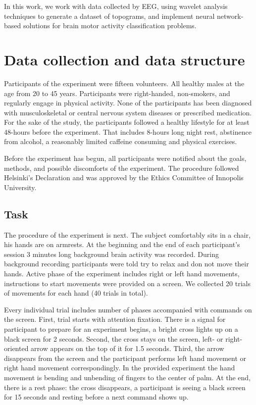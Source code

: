 \documentclass[conference]{IEEEtran}
\begin{document}
In this work, we work with data collected by EEG, using wavelet analysis techniques to generate a dataset of topograms, and implement neural network-based solutions for brain motor activity classification problems.

\section{Data collection and data structure}

Participants of the experiment were fifteen volunteers. All healthy males at the age from 20 to 45 years. Participants were right-handed, non-smokers, and regularly engage in physical activity. None of the participants has been diagnosed with musculoskeletal or central nervous system diseases or prescribed medication. For the sake of the study, the participants followed a healthy lifestyle for at least 48-hours before the experiment. That includes 8-hours long night rest, abstinence from alcohol, a reasonably limited caffeine consuming and physical exercises. 

Before the experiment has begun, all participants were notified about the goals, methods, and possible discomforts of the experiment. The procedure followed Helsinki's Declaration and was approved by the Ethics Committee of Innopolis University.

\subsection{Task}

The procedure of the experiment is next. The subject comfortably sits in a chair, his hands are on armrests. At the beginning and the end of each participant's session 3 minutes long background brain activity was recorded. During background recording participants were told try to relax and don not move their hands. Active phase of the experiment includes right or left hand movements, instructions to start movements were provided on a screen. We collected 20 trials of movements for each hand (40 trials in total).

Every individual trial includes number of phases accompanied with commands on the screen. First, trial starts with attention fixation. There is a signal for participant to prepare for an experiment begins, a bright cross lights up on a black screen for 2 seconds. Second, the cross stays on the screen, left- or right-oriented arrow appears on the top of it for 1.5 seconds. Third, the arrow disappears from the screen and the participant performs left hand movement or right hand movement correspondingly. In the provided experiment the hand movement is bending and unbending of fingers to the center of palm. At the end, there is a rest phase: the cross disappears, a participant is seeing a black screen for 15 seconds and resting before a next command shows up.
\end{document}
